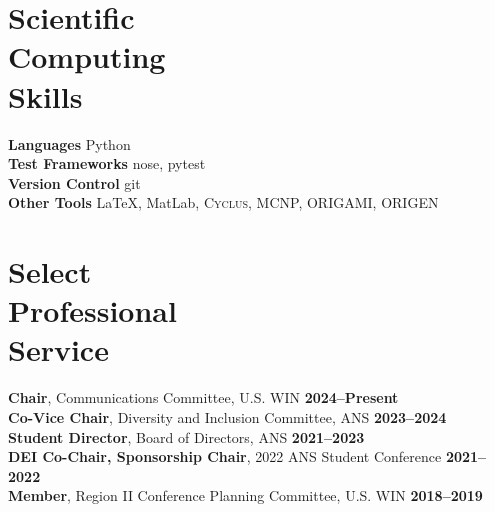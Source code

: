 \documentclass[margin,line]{resume}
\newcommand{\Cyclus}{\textsc{Cyclus}\xspace}%
\begin{document}
\begin{resume}
    \section{\mysidestyle Scientific\\Computing\\Skills}
                \textbf{Languages} \hfill Python\vspace{.5mm}\\%
                \textbf{Test Frameworks} \hfill nose, pytest\vspace{.5mm}\\%
                \textbf{Version Control} \hfill git\vspace{.5mm}\\%
                \textbf{Other Tools} \hfill \LaTeX, MatLab, \Cyclus, MCNP, ORIGAMI, ORIGEN\vspace{.5mm}%
        \vspace{-3mm}

    \section{\mysidestyle Select\\Professional\\Service}
        \textbf{Chair}, Communications Committee, U.S. WIN  \hfill \textbf{2024--Present}\\%
        \textbf{Co-Vice Chair}, Diversity and Inclusion Committee, ANS  \hfill \textbf{2023--2024}\vspace{.5mm}\\%
        \textbf{Student Director}, Board of Directors, ANS \hfill \textbf{2021--2023}\vspace{.5mm}\\%
        \textbf{DEI Co-Chair, Sponsorship Chair}, 2022 ANS Student Conference \hfill \textbf{2021--2022}\vspace{.5mm}\\%
        \textbf{Member}, Region II Conference Planning Committee, U.S. WIN  \hfill \textbf{2018--2019}\vspace{0mm}\\%



\end{resume}
\end{document}
